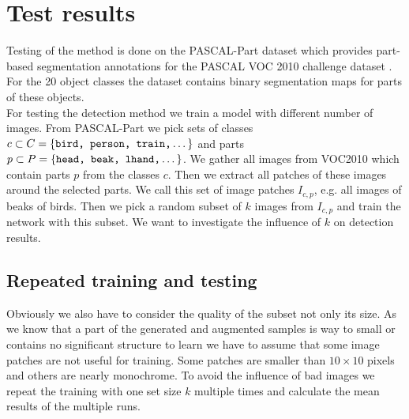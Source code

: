 %
\chapter{Test results}
\label{sec:results}
Testing of the method is done on the PASCAL-Part dataset \citep{Chen_2014_CVPR} which provides part-based segmentation annotations for the PASCAL VOC 2010 challenge dataset \citep{pascal-voc-2010}. For the 20 object classes the dataset contains binary segmentation maps for parts of these objects.\\
For testing the detection method we train a model with different number of images. From PASCAL-Part we pick sets of classes $c \subset C = \{\texttt{bird, person, train,}\dots\}$ and parts $p \subset P = \{\texttt{head, beak, lhand,}\dots\}$. We gather all images from VOC2010 which contain parts $p$ from the classes $c$. Then we extract all patches of these images around the selected parts. We call this set of image patches $I_{c,p}$, e.g. all images of beaks of birds. Then we pick a random subset of $k$ images from $I_{c,p}$ and train the network with this subset. We want to investigate the influence of $k$ on detection results.\\

\section{Repeated training and testing}
\label{sec:results:repeat}
Obviously we also have to consider the quality of the subset not only its size. As we know that a part of the generated and augmented samples is way to small or contains no significant structure to learn we have to assume that some image patches are not useful for training. Some patches are smaller than $10\times10$ pixels and others are nearly monochrome. To avoid the influence of bad images we repeat the training with one set size $k$ multiple times and calculate the mean results of the multiple runs.


